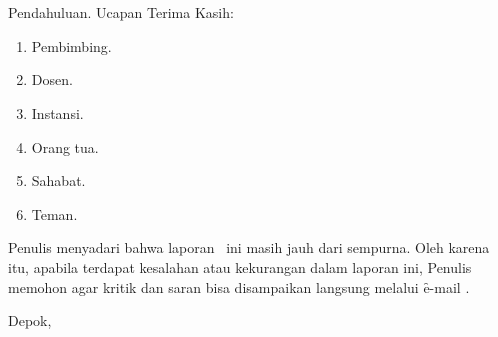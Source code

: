 \chapter*{\kataPengantar}
Pendahuluan.
Ucapan Terima Kasih:
\begin{enumerate}[topsep=0pt,itemsep=-1ex,partopsep=1ex,parsep=1ex]
	\item Pembimbing.
	\item Dosen.
	\item Instansi.
	\item Orang tua.
	\item Sahabat.
	\item Teman.
\end{enumerate}

Penulis menyadari bahwa laporan \type~ini masih jauh dari sempurna. Oleh karena itu, apabila terdapat kesalahan atau kekurangan dalam laporan ini, Penulis memohon agar kritik dan saran bisa disampaikan langsung melalui \f{e-mail} .

\vspace*{0.1cm}
\begin{flushright}
Depok, \tanggalSiapSidang\\[0.1cm]
\vspace*{1cm}
\penulis

\end{flushright}

